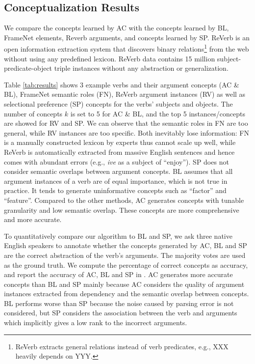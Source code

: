 \subsection{Conceptualization Results}
We compare the concepts learned by AC with the concepts learned by
BL, FrameNet elements, Reverb arguments, and concepts learned by SP.
ReVerb is an open information extraction system
that discovers binary relations\footnote{ReVerb extracts general relations
instead of verb predicates, e.g., XXX heavily depends on YYY.} from the web
without using any predefined lexicon. ReVerb data contains
15 million subject-predicate-object triple instances without
any abstraction or generalization.

Table \ref{tab:results} shows 3 example verbs and their argument concepts (AC \& BL),
FrameNet semantic roles (FN), ReVerb argument instances (RV) as well as
selectional preference (SP) concepts for the verbs' subjects and objects.
The number of concepts $k$ is set to 5 for AC \& BL, and the top 5 instances/concepts are showed for
RV and SP.
We can observe that the semantic roles in FN are too general, while RV instances
are too specific. Both inevitably lose information:
FN is a manually constructed lexicon by experts thus
cannot scale up well, while ReVerb is automatically extracted from massive
English sentences and hence comes with abundant errors (e.g., {\em ive}
as a subject of ``enjoy'').
SP does not consider semantic overlaps between argument concepts.
BL assumes that all argument instances of a verb are of
equal importance, which is not true in practice. It tends to generate uninformative concepts such as ``factor'' and ``feature''.
Compared to the other methods, AC generates concepts with
tunable granularity and low semantic overlap. These concepts are more comprehensive
and more accurate.

To quantitatively compare our algorithm to BL and SP,
we ask three native English speakers to
annotate whether the concepts generated by AC, BL and SP are
the correct abstraction of the verb's arguments.
The majority votes are used as the ground truth. We compute the percentage of
correct concepts as accuracy, and report the accuracy of
AC, BL and SP in .
AC generates more accurate concepts than BL and SP mainly because AC
considers the quality of argument instances extracted from dependency
and the semantic overlap between concepts.
BL performs worse than SP because the noise caused by parsing
error is not considered, but SP considers the association between the verb and
arguments which implicitly gives a low rank to the incorrect arguments.

